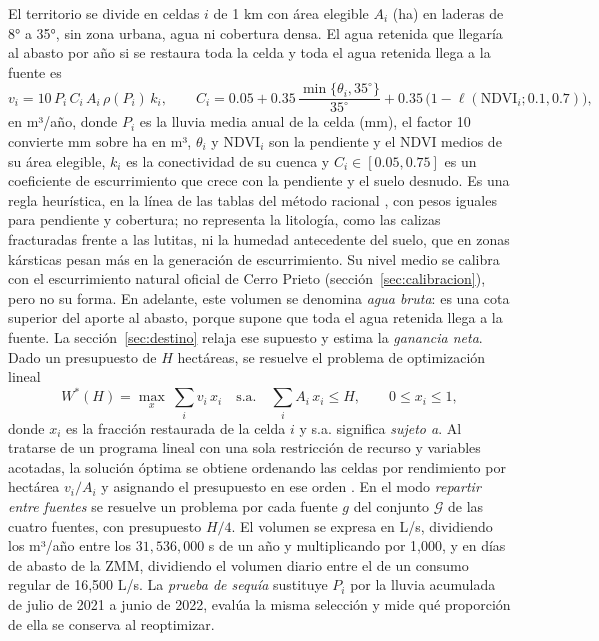 El territorio se divide en celdas $i$ de 1 km con área elegible $A_i$ (ha) en laderas de 8° a 35°, sin zona urbana, agua ni cobertura densa. El agua retenida que llegaría al abasto por año si se restaura toda la celda y toda el agua retenida llega a la fuente es
\begin{equation}
v_i = 10\,P_i\, C_i\, A_i\, \rho(P_i)\, k_i, \qquad C_i = 0.05 + 0.35\,\frac{\min\{\theta_i,35^\circ\}}{35^\circ} + 0.35\,\bigl(1-\ell(\text{NDVI}_i;0.1,0.7)\bigr),
\end{equation}
en m³/año, donde $P_i$ es la lluvia media anual de la celda (mm), el factor 10 convierte mm sobre ha en m³, $\theta_i$ y $\text{NDVI}_i$ son la pendiente y el NDVI medios de su área elegible, $k_i$ es la conectividad de su cuenca y $C_i\in[0.05,0.75]$ es un coeficiente de escurrimiento que crece con la pendiente y el suelo desnudo. Es una regla heurística, en la línea de las tablas del método racional , con pesos iguales para pendiente y cobertura; no representa la litología, como las calizas fracturadas frente a las lutitas, ni la humedad antecedente del suelo, que en zonas kársticas pesan más en la generación de escurrimiento. Su nivel medio se calibra con el escurrimiento natural oficial de Cerro Prieto (sección~\ref{sec:calibracion}), pero no su forma. En adelante, este volumen se denomina \emph{agua bruta}: es una cota superior del aporte al abasto, porque supone que toda el agua retenida llega a la fuente. La sección~\ref{sec:destino} relaja ese supuesto y estima la \emph{ganancia neta}. Dado un presupuesto de $H$ hectáreas, se resuelve el problema de optimización lineal
\begin{equation}
W^\ast(H)=\max_{x}\ \sum_i v_i\, x_i \quad\text{s.a.}\quad \sum_i A_i\, x_i \le H,\qquad 0\le x_i\le 1,
\end{equation}
donde $x_i$ es la fracción restaurada de la celda $i$ y s.a. significa \emph{sujeto a}. Al tratarse de un programa lineal con una sola restricción de recurso y variables acotadas, la solución óptima se obtiene ordenando las celdas por rendimiento por hectárea $v_i/A_i$ y asignando el presupuesto en ese orden . En el modo \emph{repartir entre fuentes} se resuelve un problema por cada fuente $g$ del conjunto $\mathcal G$ de las cuatro fuentes, con presupuesto $H/4$. El volumen se expresa en L/s, dividiendo los m³/año entre los $31{,}536{,}000$ s de un año y multiplicando por 1,000, y en días de abasto de la ZMM, dividiendo el volumen diario entre el de un consumo regular de 16,500 L/s. La \emph{prueba de sequía} sustituye $P_i$ por la lluvia acumulada de julio de 2021 a junio de 2022, evalúa la misma selección y mide qué proporción de ella se conserva al reoptimizar.

